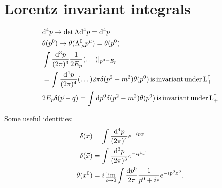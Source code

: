\section{Lorentz invariant integrals}
\begin{mybox}{}
	\begin{align}
		&\mathrm{d}^4 p \rightarrow \det \Lambda \mathrm{d}^4 p = \mathrm{d}^4 p \\
		& \theta(p^0) \rightarrow \theta (\Lambda^0_{\;\mu} p^\mu) = \theta(p^0) \\
		&\int \frac{\mathrm{d}^3 p}{(2 \pi)^3} \frac{1}{2 E_p} (\dots) |_{p^0 = E_p}  \\
		&= \int \frac{\mathrm{d}^4 p}{(2 \pi)^4} (\dots) 2 \pi \delta(p^2-m^2) \theta(p^0) \mathrm{\,is\,invariant\,under\,L^\uparrow_+}\nonumber \\
		& 2 E_p \delta(\vec{p}-\vec{q}) = \int \mathrm{d} p^0 \delta(p^2-m^2)\theta(p^0) \mathrm{\,is\,invariant\,under\,L^\uparrow_+}
	\end{align}
\end{mybox}
Some useful identities:
\begin{align}
	\delta(x) &= \int \frac{\mathrm{d}^4 p}{(2 \pi)^4} e^{-ipx} \\
	\delta(\vec{x}) &= \int \frac{\mathrm{d}^3 p}{(2 \pi)^3} e^{-i \vec{p}\cdot\vec{x}} \\
	\theta(x^0) &= i \lim_{\epsilon \rightarrow 0} \int \frac{\mathrm{d} p^0}{2 \pi} \frac{1}{p^0+i\epsilon} e^{-ip^0 x^0}. 
\end{align}

